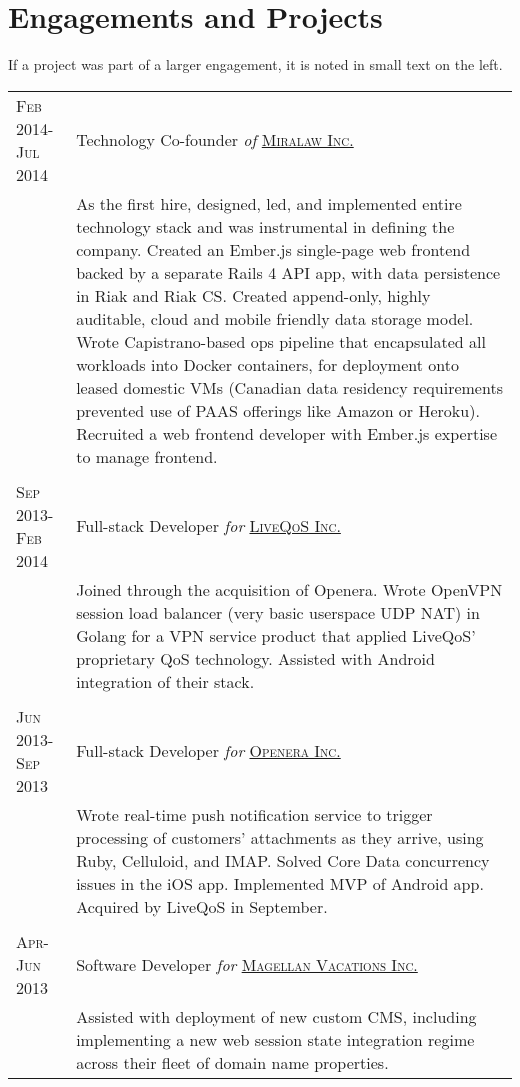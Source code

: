 \documentclass[letterpaper,10pt]{article}
\begin{document}
\section{Engagements and Projects}
\footnotesize{If a project was part of a larger engagement, it is noted in small text on the left.}
\begin{longtable}{p{3cm}|p{12cm}}
  \textsc{Feb 2014-Jul 2014} & Technology Co-founder \emph{of} \href{http://www.miralaw.ca/}{\textsc{Miralaw Inc.}} \\
   & \footnotesize{As the first hire, designed, led, and implemented entire technology stack and was instrumental in defining the company.  Created an Ember.js single-page web frontend backed by a separate Rails 4 API app, with data persistence in Riak and Riak CS.  Created append-only, highly auditable, cloud and mobile friendly data storage model.  Wrote Capistrano-based ops pipeline that encapsulated all workloads into Docker containers, for deployment onto leased domestic VMs (Canadian data residency requirements prevented use of PAAS offerings like Amazon or Heroku).  Recruited a web frontend developer with Ember.js expertise to manage frontend.} \\
\multicolumn{2}{c}{} \\
  \textsc{Sep 2013-Feb 2014} & Full-stack Developer \emph{for} \href{http://www.liveqos.com/}{\textsc{LiveQoS Inc.}} \\
   & \footnotesize{Joined through the acquisition of Openera.  Wrote OpenVPN session load balancer (very basic userspace UDP NAT) in Golang for a VPN service product that applied LiveQoS' proprietary QoS technology.  Assisted with Android integration of their stack.} \\
\multicolumn{2}{c}{} \\
  \textsc{Jun 2013-Sep 2013} & Full-stack Developer \emph{for} \href{http://www.openera.com/}{\textsc{Openera Inc.}} \\
   & \footnotesize{Wrote real-time push notification service to trigger processing of customers' attachments as they arrive, using Ruby, Celluloid, and IMAP.  Solved Core Data concurrency issues in the iOS app.  Implemented MVP of Android app.  Acquired by LiveQoS in September.} \\
\pagebreak
\multicolumn{2}{c}{} \\
  \textsc{Apr-Jun 2013} & Software Developer \emph{for} \href{http://www.magellanvacations.com/}{\textsc{Magellan Vacations Inc.}} \\
   & \footnotesize{Assisted with deployment of new custom CMS, including implementing a new web session state integration regime across their fleet of domain name properties.} \\

\end{longtable}
\end{document}
